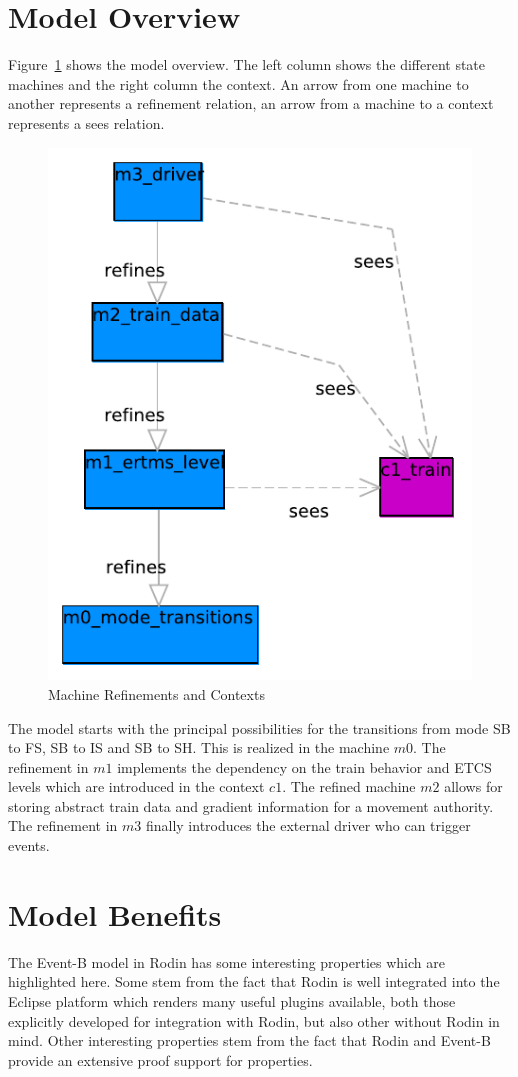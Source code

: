 \documentclass{template/openetcs_article}
\begin{document}
\section{Model Overview}
\label{sec:model-overview}

Figure~\ref{fig:model-overview} shows the model overview. The left column shows
the different state machines and the right column the context. An arrow from one
machine to another represents a refinement relation, an arrow from a machine to
a context represents a sees relation.

\begin{figure}[ht]
  \centering
  \includegraphics[width=.35\textwidth]{Subset_026_Chap_4_6}
  \caption{Machine Refinements and Contexts}
  \label{fig:model-overview}
\end{figure}

The model starts with the principal possibilities for the transitions from mode
SB to FS, SB to IS and SB to SH. This is realized in the machine $m0$. The
refinement in $m1$ implements the dependency on the train behavior and ETCS
levels which are introduced in the context $c1$. The refined machine $m2$ allows
for storing abstract train data and gradient information for a movement
authority. The refinement in $m3$ finally introduces the external driver who can
trigger events.

\section{Model Benefits}
\label{sec:model-highlights}

The Event-B model in Rodin has some interesting properties which are highlighted
here. Some stem from the fact that Rodin is well integrated into the Eclipse
platform which renders many useful plugins available, both those explicitly
developed for integration with Rodin, but also other without Rodin in mind.
Other interesting properties stem from the fact that Rodin and Event-B provide
an extensive proof support for properties.
\end{document}

